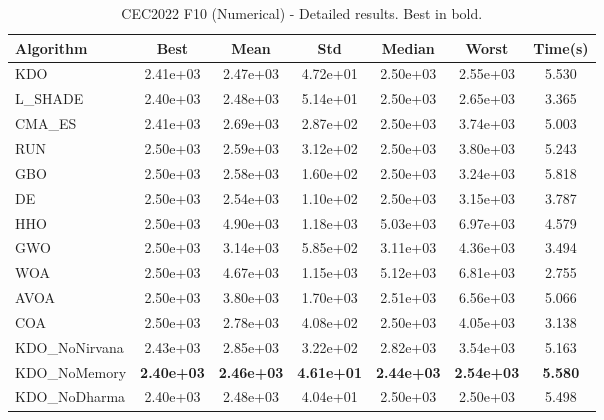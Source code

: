 \begin{table}[H]
\centering\small
\caption{CEC2022 F10 (Numerical) - Detailed results. Best in bold.}
\label{tab:cec2022_F10}
\begin{tabular}{lcccccc}
\toprule
\textbf{Algorithm} & \textbf{Best} & \textbf{Mean} & \textbf{Std} & \textbf{Median} & \textbf{Worst} & \textbf{Time(s)} \\
\midrule
KDO & 2.41e+03 & 2.47e+03 & 4.72e+01 & 2.50e+03 & 2.55e+03 & 5.530 \\
L_SHADE & 2.40e+03 & 2.48e+03 & 5.14e+01 & 2.50e+03 & 2.65e+03 & 3.365 \\
CMA_ES & 2.41e+03 & 2.69e+03 & 2.87e+02 & 2.50e+03 & 3.74e+03 & 5.003 \\
RUN & 2.50e+03 & 2.59e+03 & 3.12e+02 & 2.50e+03 & 3.80e+03 & 5.243 \\
GBO & 2.50e+03 & 2.58e+03 & 1.60e+02 & 2.50e+03 & 3.24e+03 & 5.818 \\
DE & 2.50e+03 & 2.54e+03 & 1.10e+02 & 2.50e+03 & 3.15e+03 & 3.787 \\
HHO & 2.50e+03 & 4.90e+03 & 1.18e+03 & 5.03e+03 & 6.97e+03 & 4.579 \\
GWO & 2.50e+03 & 3.14e+03 & 5.85e+02 & 3.11e+03 & 4.36e+03 & 3.494 \\
WOA & 2.50e+03 & 4.67e+03 & 1.15e+03 & 5.12e+03 & 6.81e+03 & 2.755 \\
AVOA & 2.50e+03 & 3.80e+03 & 1.70e+03 & 2.51e+03 & 6.56e+03 & 5.066 \\
COA & 2.50e+03 & 2.78e+03 & 4.08e+02 & 2.50e+03 & 4.05e+03 & 3.138 \\
KDO_NoNirvana & 2.43e+03 & 2.85e+03 & 3.22e+02 & 2.82e+03 & 3.54e+03 & 5.163 \\
KDO_NoMemory & \textbf{2.40e+03} & \textbf{2.46e+03} & \textbf{4.61e+01} & \textbf{2.44e+03} & \textbf{2.54e+03} & \textbf{5.580} \\
KDO_NoDharma & 2.40e+03 & 2.48e+03 & 4.04e+01 & 2.50e+03 & 2.50e+03 & 5.498 \\
\bottomrule
\end{tabular}
\end{table}
